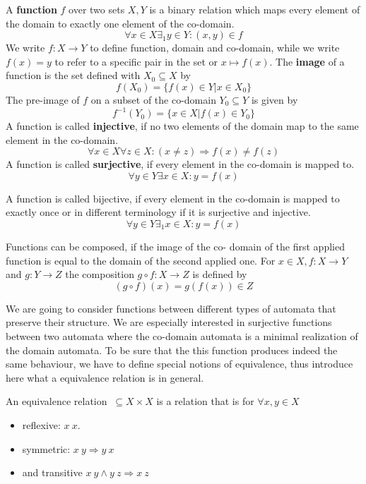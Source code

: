            
            \begin{definition}[Function]\label{fun}
            A \textbf{function} $f$ over two sets $X, Y$ is a binary relation which maps every element of the domain to exactly one element of the co-domain.
            \[ \forall x \in X \exists_1 y \in Y : (x,y) \in f \]
            We write $f: X \rightarrow Y$ to define function, domain and co-domain, while we write $f(x) = y$ to refer to a specific pair in the set or $x \mapsto f(x)$. 
            The \textbf{image} of a function is the set defined with $X_0 \subseteq X$ by
            \[ f(X_0) = \{ f(x) \in Y | x \in X_0 \} \]
            The pre-image of $f$ on a subset of the co-domain $Y_0 \subseteq Y$ is given by
            \[ f^{-1}(Y_0) = \{ x \in X | f(x) \in Y_0 \} \]
            A function is called \textbf{injective}, if no two elements of the domain map to the same element in the co-domain.
            \[ \forall x \in X \forall z \in X: (x \neq z) \Rightarrow f(x) \neq f(z) \]
            A function is called \textbf{surjective}, if every element in the co-domain is mapped to.
                \[ \forall y \in Y \exists x \in X: y = f(x) \]
                
            A function is called bijective, if every element in the co-domain is mapped to exactly once or in different terminology if it is surjective and injective.
            \[ \forall y \in Y  \exists_1 x \in X: y = f(x) \]
            
            Functions can be composed, if the image of the co- domain of the first applied function is equal to the domain of the second applied one. For $x \in X, f: X \rightarrow Y$ and $g: Y \rightarrow Z$ the composition $g \circ f: X \rightarrow Z$ is defined by
            \[ (g \circ f)(x) = g(f(x)) \in Z  \]
            \end{definition}
            
             We are going to consider functions between different types of automata that preserve their structure. We are especially interested in surjective functions between two automata where the co-domain automata is a minimal realization of the domain automata. To be sure that the this function produces indeed the same behaviour, we have to define special notions of equivalence, thus introduce here what a equivalence relation is in general.
            
            \begin{definition}\label{eqrel}
            An equivalence relation $~\subseteq X \times X$ is a relation that is for $\forall x, y \in X$
            \begin{itemize}
             \item reflexive: $ x ~ x$.
             \item symmetric: $x ~ y \Rightarrow y ~ x$
             \item and transitive $x ~ y \wedge y ~ z \Rightarrow x ~ z$
            \end{itemize} 
            \end{definition}
            
